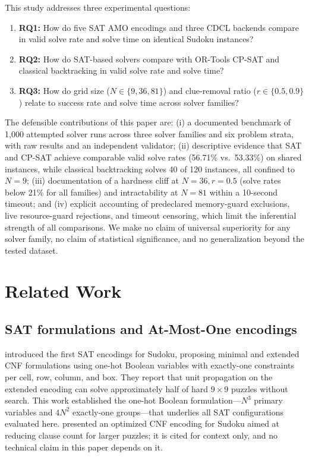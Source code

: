 \documentclass[a4paper,fleqn]{cas-sc}
\begin{document}
This study addresses three experimental questions:

\begin{enumerate}
    \item \textbf{RQ1:} How do five SAT AMO encodings and three CDCL backends compare in valid solve rate and solve time on identical Sudoku instances?
    \item \textbf{RQ2:} How do SAT-based solvers compare with OR-Tools CP-SAT and classical backtracking in valid solve rate and solve time?
    \item \textbf{RQ3:} How do grid size (\(N \in \{9, 36, 81\}\)) and clue-removal ratio (\(r \in \{0.5, 0.9\}\)) relate to success rate and solve time across solver families?
\end{enumerate}

The defensible contributions of this paper are: (i) a documented benchmark of 1{,}000 attempted solver runs across three solver families and six problem strata, with raw results and an independent validator; (ii) descriptive evidence that SAT and CP-SAT achieve comparable valid solve rates (56.71\% vs.\ 53.33\%) on shared instances, while classical backtracking solves 40 of 120 instances, all confined to \(N=9\); (iii) documentation of a hardness cliff at \(N=36, r=0.5\) (solve rates below 21\% for all families) and intractability at \(N=81\) within a 10-second timeout; and (iv) explicit accounting of predeclared memory-guard exclusions, live resource-guard rejections, and timeout censoring, which limit the inferential strength of all comparisons. We make no claim of universal superiority for any solver family, no claim of statistical significance, and no generalization beyond the tested dataset.


\section{Related Work}

\subsection{SAT formulations and At-Most-One encodings}

\citet{lynce2006sudoku} introduced the first SAT encodings for Sudoku, proposing minimal and extended CNF formulations using one-hot Boolean variables with exactly-one constraints per cell, row, column, and box. They report that unit propagation on the extended encoding can solve approximately half of hard \(9\times9\) puzzles without search. This work established the one-hot Boolean formulation---\(N^3\) primary variables and \(4N^2\) exactly-one groups---that underlies all SAT configurations evaluated here. \citet{kwon2016optimized} presented an optimized CNF encoding for Sudoku aimed at reducing clause count for larger puzzles; it is cited for context only, and no technical claim in this paper depends on it.
\end{document}
